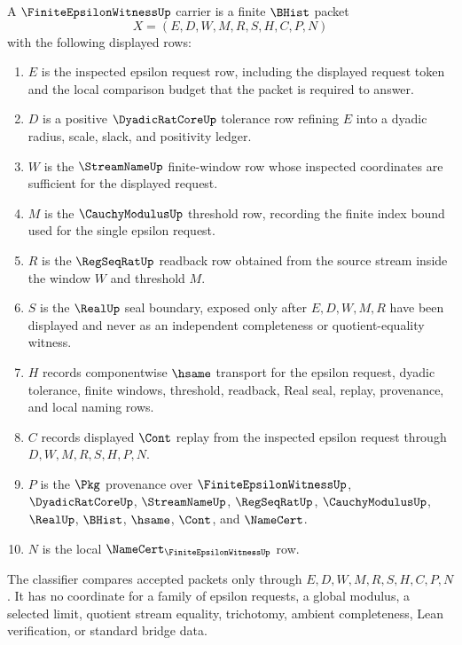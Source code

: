 \begin{definition}
\label{def:finite-epsilon-witness-carrier}
A $\FiniteEpsilonWitnessUp$ carrier is a finite $\BHist$ packet
$$
X=(E,D,W,M,R,S,H,C,P,N)
$$
with the following displayed rows:
\begin{enumerate}
\item $E$ is the inspected epsilon request row, including the displayed request token and the local comparison budget that the packet is required to answer.
\item $D$ is a positive $\DyadicRatCoreUp$ tolerance row refining $E$ into a dyadic radius, scale, slack, and positivity ledger.
\item $W$ is the $\StreamNameUp$ finite-window row whose inspected coordinates are sufficient for the displayed request.
\item $M$ is the $\CauchyModulusUp$ threshold row, recording the finite index bound used for the single epsilon request.
\item $R$ is the $\RegSeqRatUp$ readback row obtained from the source stream inside the window $W$ and threshold $M$.
\item $S$ is the $\RealUp$ seal boundary, exposed only after $E,D,W,M,R$ have been displayed and never as an independent completeness or quotient-equality witness.
\item $H$ records componentwise $\hsame$ transport for the epsilon request, dyadic tolerance, finite windows, threshold, readback, Real seal, replay, provenance, and local naming rows.
\item $C$ records displayed $\Cont$ replay from the inspected epsilon request through $D,W,M,R,S,H,P,N$.
\item $P$ is the $\Pkg$ provenance over $\FiniteEpsilonWitnessUp$, $\DyadicRatCoreUp$, $\StreamNameUp$, $\RegSeqRatUp$, $\CauchyModulusUp$, $\RealUp$, $\BHist$, $\hsame$, $\Cont$, and $\NameCert$.
\item $N$ is the local $\NameCert_{\FiniteEpsilonWitnessUp}$ row.
\end{enumerate}
The classifier compares accepted packets only through $E,D,W,M,R,S,H,C,P,N$. It has no coordinate for a family of epsilon requests, a global modulus, a selected limit, quotient stream equality, trichotomy, ambient completeness, Lean verification, or standard bridge data.
\end{definition}

